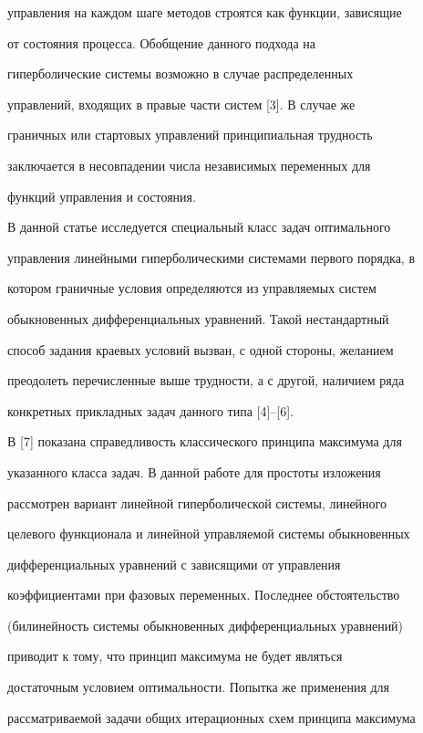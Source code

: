 управления на каждом шаге методов строятся как функции, зависящие


от состояния процесса. Обобщение данного подхода на


гиперболические системы возможно в случае распределенных


управлений, входящих в правые части систем [3]. В случае же


граничных или стартовых управлений принципиальная трудность


заключается в несовпадении числа независимых переменных для


функций управления и состояния.





В данной статье исследуется специальный класс задач оптимального


управления линейными гиперболическими системами первого порядка, в


котором граничные условия определяются из управляемых систем


обыкновенных дифференциальных уравнений. Такой нестандартный


способ задания краевых условий вызван, с одной стороны, желанием


преодолеть перечисленные выше трудности, а с другой, наличием ряда


конкретных прикладных задач данного типа [4]--[6].





В [7] показана справедливость классического принципа максимума для


указанного класса задач. В данной работе для простоты изложения


рассмотрен вариант линейной гиперболической системы, линейного


целевого функционала и линейной управляемой системы обыкновенных


дифференциальных уравнений с зависящими от управления


коэффициентами при фазовых переменных.  Последнее обстоятельство


(билинейность системы обыкновенных дифференциальных уравнений)


приводит к тому, что принцип максимума не будет являться


достаточным условием оптимальности. Попытка же применения для


рассматриваемой задачи общих итерационных схем принципа максимума


